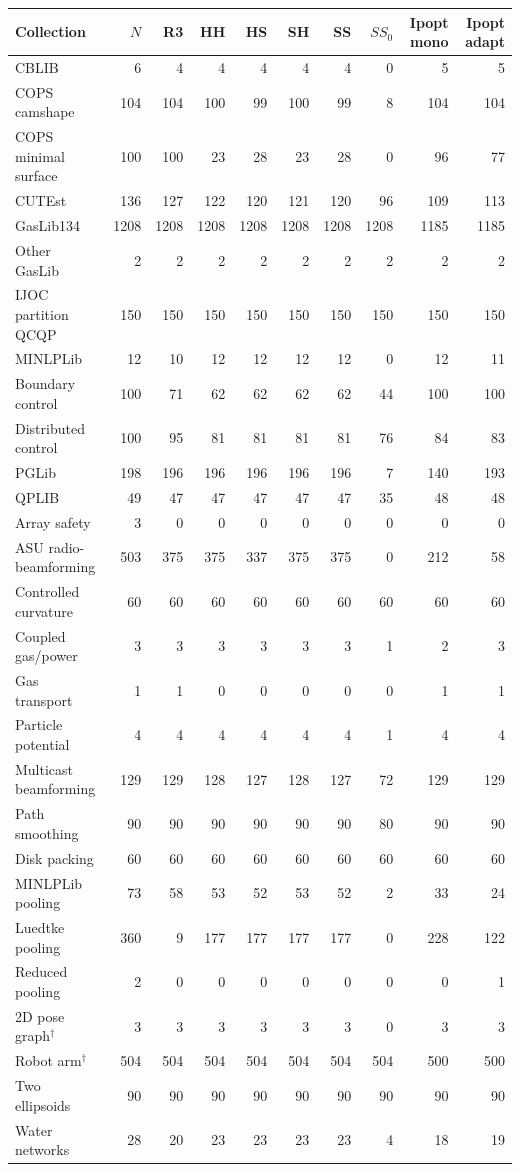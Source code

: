 \begin{tabular}{@{}lrrrrrrrrr@{}}
\toprule
Collection & $N$ & R3 & HH & HS & SH & SS & $SS_0$ & Ipopt mono & Ipopt adapt \\
\midrule
CBLIB & 6 & 4 & 4 & 4 & 4 & 4 & 0 & 5 & 5 \\
COPS camshape & 104 & 104 & 100 & 99 & 100 & 99 & 8 & 104 & 104 \\
COPS minimal surface & 100 & 100 & 23 & 28 & 23 & 28 & 0 & 96 & 77 \\
CUTEst & 136 & 127 & 122 & 120 & 121 & 120 & 96 & 109 & 113 \\
GasLib134 & 1208 & 1208 & 1208 & 1208 & 1208 & 1208 & 1208 & 1185 & 1185 \\
Other GasLib & 2 & 2 & 2 & 2 & 2 & 2 & 2 & 2 & 2 \\
IJOC partition QCQP & 150 & 150 & 150 & 150 & 150 & 150 & 150 & 150 & 150 \\
MINLPLib & 12 & 10 & 12 & 12 & 12 & 12 & 0 & 12 & 11 \\
Boundary control & 100 & 71 & 62 & 62 & 62 & 62 & 44 & 100 & 100 \\
Distributed control & 100 & 95 & 81 & 81 & 81 & 81 & 76 & 84 & 83 \\
PGLib & 198 & 196 & 196 & 196 & 196 & 196 & 7 & 140 & 193 \\
QPLIB & 49 & 47 & 47 & 47 & 47 & 47 & 35 & 48 & 48 \\
Array safety & 3 & 0 & 0 & 0 & 0 & 0 & 0 & 0 & 0 \\
ASU radio-beamforming & 503 & 375 & 375 & 337 & 375 & 375 & 0 & 212 & 58 \\
Controlled curvature & 60 & 60 & 60 & 60 & 60 & 60 & 60 & 60 & 60 \\
Coupled gas/power & 3 & 3 & 3 & 3 & 3 & 3 & 1 & 2 & 3 \\
Gas transport & 1 & 1 & 0 & 0 & 0 & 0 & 0 & 1 & 1 \\
Particle potential & 4 & 4 & 4 & 4 & 4 & 4 & 1 & 4 & 4 \\
Multicast beamforming & 129 & 129 & 128 & 127 & 128 & 127 & 72 & 129 & 129 \\
Path smoothing & 90 & 90 & 90 & 90 & 90 & 90 & 80 & 90 & 90 \\
Disk packing & 60 & 60 & 60 & 60 & 60 & 60 & 60 & 60 & 60 \\
MINLPLib pooling & 73 & 58 & 53 & 52 & 53 & 52 & 2 & 33 & 24 \\
Luedtke pooling & 360 & 9 & 177 & 177 & 177 & 177 & 0 & 228 & 122 \\
Reduced pooling & 2 & 0 & 0 & 0 & 0 & 0 & 0 & 0 & 1 \\
2D pose graph$^\dagger$ & 3 & 3 & 3 & 3 & 3 & 3 & 0 & 3 & 3 \\
Robot arm$^\dagger$ & 504 & 504 & 504 & 504 & 504 & 504 & 504 & 500 & 500 \\
Two ellipsoids & 90 & 90 & 90 & 90 & 90 & 90 & 90 & 90 & 90 \\
Water networks & 28 & 20 & 23 & 23 & 23 & 23 & 4 & 18 & 19 \\
\bottomrule
\end{tabular}
